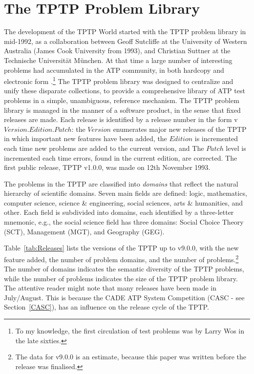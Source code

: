 \documentclass{easychair}
\begin{document}
\section{The TPTP Problem Library}
\label{TPTP}

The development of the TPTP World started with the TPTP problem library in mid-1992, as a 
collaboration between Geoff Sutcliffe at the University of Western Australia (James Cook 
University from 1993), and Christian Suttner at the Technische Universit{\"a}t M{\"u}nchen.
At that time a large number of interesting problems had accumulated in the ATP community, in
both hardcopy \cite{MOW76,WM76,Pel86-JAR,BL+86,Qua92-JAR,MW92-CADE-11} and electronic form
\cite{ANL,SPRFN}.\footnote{To my knowledge, the first circulation of test problems was by 
Larry Wos in the late sixties.} 
The TPTP problem library was designed to centralize and unify these disparate collections, 
to provide a comprehensive library of ATP test problems in a simple, unambiguous, reference 
mechanism.
The TPTP problem library is managed in the manner of a software product, in the sense that fixed 
releases are made.
Each release is identified by a release number in the form v$Version$.$Edition$.$Patch$:
the $Version$ enumerates major new releases of the TPTP in which important new features have 
been added,
the $Edition$ is incremented each time new problems are added to the current version, and
The $Patch$ level is incremented each time errors, found in the current edition, are corrected. 
The first public release, TPTP v1.0.0, was made on 12th November 1993.

The problems in the TPTP are classified into {\em domains} that reflect the natural hierarchy of 
scientific domains.
Seven main fields are defined: logic, mathematics, computer science, science \& engineering, 
social sciences, arts \& humanities, and other. 
Each field is subdivided into domains, each identified by a three-letter mnemonic, e.g., the
social science field has three domains: Social Choice Theory (SCT), Management (MGT), and
Geography (GEG).

Table~\ref{tab:Releases} lists the versions of the TPTP up to v9.0.0, with the new feature added, 
the number of problem domains, and the number of problems.\footnote{%
The data for v9.0.0 is an estimate, because this paper was written before the release was
finalised.}
The number of domains indicates the semantic diversity of the TPTP problems, while the number
of problems indicates the size of the TPTP problem library.
The attentive reader might note that many releases have been made in July/August.
This is because the CADE ATP System Competition (CASC - see Section~\ref{CASC}), has an 
influence on the release cycle of the TPTP. 
\end{document}
